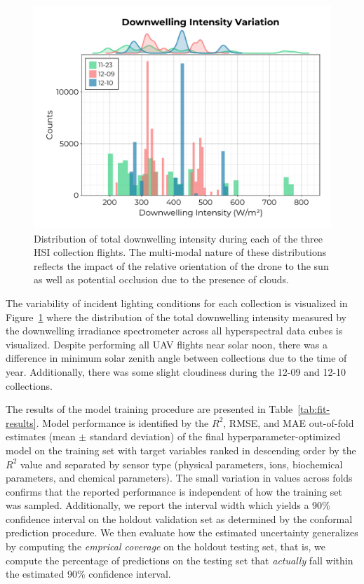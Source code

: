 \documentclass[sensors,article,submit,pdftex,moreauthors]{Definitions/mdpi}
\begin{document}
\begin{figure}
\includegraphics[width=0.7\columnwidth]{paper/figures/results/downwelling-hist.pdf}
\caption{Distribution of total downwelling intensity during each of the three HSI collection flights. The multi-modal nature of these distributions reflects the impact of the relative orientation of the drone to the sun as well as potential occlusion due to the presence of clouds.\label{fig:downwelling-hist}}
\end{figure}   

The variability of incident lighting conditions for each collection is visualized in Figure~\ref{fig:downwelling-hist} where the distribution of the total downwelling intensity measured by the downwelling irradiance spectrometer across all hyperspectral data cubes is visualized. Despite performing all UAV flights near solar noon, there was a difference in minimum solar zenith angle between collections due to the time of year. Additionally, there was some slight cloudiness during the 12-09 and 12-10 collections. 

The results of the model training procedure are presented in Table~\ref{tab:fit-results}. Model performance is identified by the $R^2$, RMSE, and MAE out-of-fold estimates (mean $\pm$ standard deviation) of the final hyperparameter-optimized model on the training set with target variables ranked in descending order by the $R^2$ value and separated by sensor type (physical parameters, ions, biochemical parameters, and chemical parameters). The small variation in values across folds confirms that the reported performance is independent of how the training set was sampled. Additionally, we report the interval width which yields a 90\% confidence interval on the holdout validation set as determined by the conformal prediction procedure. We then evaluate how the estimated uncertainty generalizes by computing the \textit{emprical coverage} on the holdout testing set, that is, we compute the percentage of predictions on the testing set that \textit{actually} fall within the estimated 90\% confidence interval. 
\end{document}
